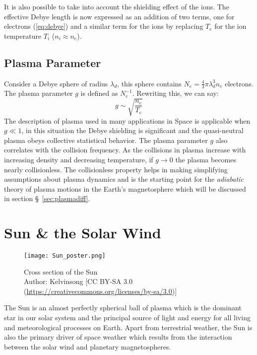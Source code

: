 It is also possible to take into account the shielding effect of the ions. The effective Debye length is now 
expressed as an addition of two terms, one for electrons (\cref{eq:debye}) and a similar term for the ions by replacing 
$T_e$ for the ion temperature $T_i$ ($n_i \approx n_e$). 

\subsection*{Plasma Parameter}

Consider a Debye sphere of radius $\lambda_d$, this sphere contains $N_e = \frac{4}{3}\pi \lambda^3_d n_e$ electrons. 
The plasma parameter $g$ is defined as $N_{e}^{-1}$. Rewriting this, we can say:
%
\begin{equation}
    g \sim \sqrt{\frac{n_e}{T_e}}
\end{equation}
%
The description of plasma used in many applications in Space is applicable when $g \ll 1$, in this situation 
the Debye shielding is significant and the quasi-neutral plasma obeys collective statistical behavior. 
The plasma parameter $g$ also correlates with the collision frequency. As the collisions in plasma increase 
with increasing density and decreasing temperature, if $g \longrightarrow 0$ the plasma becomes nearly collisionless. 
The collisionless property helps in making simplifying assumptions about plasma dynamics and is the starting point 
for the \emph{adiabatic} theory of plasma motions in the Earth's magnetosphere which will be discussed in section 
\S~\ref{sec:plasmadiff}.

\section{Sun \& the Solar Wind}\label{sec:solar}

\begin{figure}
    \noindent\centering\texttt{[image: Sun\_poster.png]}
    \caption{{\small Cross section of the Sun \\ 
    Author: Kelvinsong [CC BY-SA 3.0 (\url{https://creativecommons.org/licenses/by-sa/3.0})]}}
    \label{fig:SunLayers}
\end{figure}

The Sun is an almost perfectly spherical ball of plasma which is the dominant star in our solar system and 
the principal source of light and energy for all living and meteorological processes on Earth. Apart from 
terrestrial weather, the Sun is also the primary driver of space weather which results from the interaction 
between the solar wind and planetary magnetospheres.

